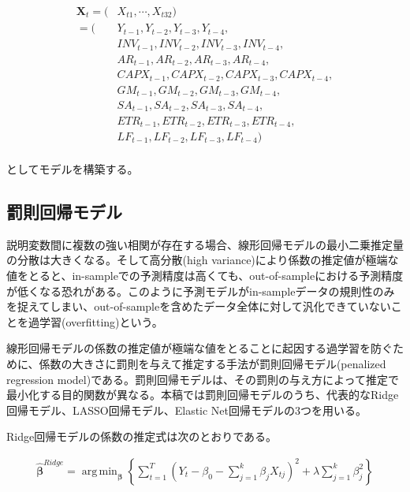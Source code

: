 \documentclass[a4paper, 12pt]{jsreport}
\DeclareMathOperator*{\argmin}{arg\,min}
\begin{document}
\begin{equation}
  \begin{split}
    \bm{X}_t = (&X_{t1}, \cdots ,X_{t32}) \\ 
    =(&Y_{t-1}, Y_{t-2}, Y_{t-3}, Y_{t-4}, \\
    & INV_{t-1}, INV_{t-2}, INV_{t-3}, INV_{t-4}, \\
    & AR_{t-1}, AR_{t-2}, AR_{t-3}, AR_{t-4}, \\
    & CAPX_{t-1}, CAPX_{t-2}, CAPX_{t-3}, CAPX_{t-4}, \\
    & GM_{t-1}, GM_{t-2}, GM_{t-3}, GM_{t-4}, \\
    & SA_{t-1}, SA_{t-2}, SA_{t-3}, SA_{t-4}, \\
    & ETR_{t-1}, ETR_{t-2}, ETR_{t-3}, ETR_{t-4}, \\ 
    & LF_{t-1}, LF_{t-2}, LF_{t-3}, LF_{t-4}) \\
  \end{split}
\end{equation}

としてモデルを構築する。

\subsection{罰則回帰モデル}

説明変数間に複数の強い相関が存在する場合、線形回帰モデルの最小二乗推定量の分散は大きくなる。そして高分散(high variance)により係数の推定値が極端な値をとると、in-sampleでの予測精度は高くても、out-of-sampleにおける予測精度が低くなる恐れがある。このように予測モデルがin-sampleデータの規則性のみを捉えてしまい、out-of-sampleを含めたデータ全体に対して汎化できていないことを過学習(overfitting)という。

線形回帰モデルの係数の推定値が極端な値をとることに起因する過学習を防ぐために、係数の大きさに罰則を与えて推定する手法が罰則回帰モデル(penalized regression model)である。罰則回帰モデルは、その罰則の与え方によって推定で最小化する目的関数が異なる。本稿では罰則回帰モデルのうち、代表的なRidge回帰モデル、LASSO回帰モデル、Elastic Net回帰モデルの3つを用いる。

Ridge回帰モデルの係数の推定式は次のとおりである。

\begin{equation} \label{ridge}
  \begin{split}
    \hat{\bm{\beta}}^{Ridge} = \argmin_{\bm{\beta}}\left\{ \sum_{t=1}^{T} \left( Y_t - \beta_0 - \sum_{j=1}^{k} \beta_{j} X_{tj} \right)^2 + \lambda \sum_{j=1}^{k} \beta_{j}^{2} \right\}
  \end{split}
\end{equation}
\end{document}
